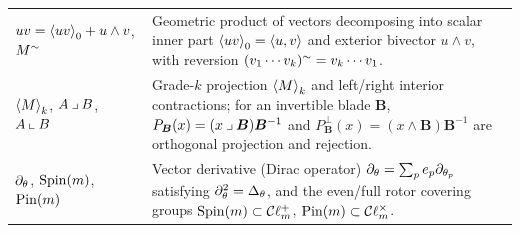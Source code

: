 \begin{xltabular}{\textwidth}{@{}lX@{}}
$u v = \left\langle u v \right\rangle_0 + u \wedge v$, $M^{\sim}$ & Geometric product of vectors decomposing into scalar inner part $\left\langle uv \right\rangle_0 = \left\langle u, v \right\rangle$ and exterior bivector $u \wedge v$, with reversion $(v_1 \cdots v_k)^{\sim} = v_k \cdots v_1$. \\
$\left\langle M \right\rangle_{k}$, $A \mathbin{\lrcorner} B$, $A \mathbin{\llcorner} B$ & Grade-$k$ projection $\left\langle M \right\rangle_{k}$ and left/right interior contractions; for an invertible blade $\bm{B}$, $P_{\bm{B}}(x) = (x \mathbin{\lrcorner} \bm{B})\bm{B}^{-1}$ and $P_{\bm{B}}^\perp(x) = (x \wedge \bm{B})\bm{B}^{-1}$ are orthogonal projection and rejection. \\
$\partial_\theta$, $\operatorname{Spin}(m)$, $\operatorname{Pin}(m)$ & Vector derivative (Dirac operator) $\partial_\theta = \sum_{p} e_p \partial_{\theta_p}$ satisfying $\partial_\theta^2 = \Delta_\theta$, and the even/full rotor covering groups $\operatorname{Spin}(m) \subset \mathcal{C}\ell_m^+$, $\operatorname{Pin}(m) \subset \mathcal{C}\ell_m^\times$. \\
\end{xltabular}
